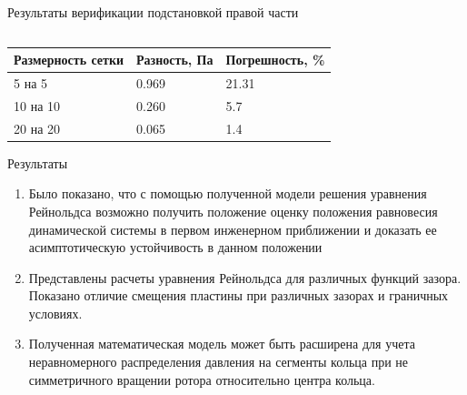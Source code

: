 \documentclass[ignoreonframetext,unicode]{beamer}
\begin{document}
\begin{frame}{Результаты верификации подстановкой правой части}
\begin{columns}
	\end{columns}

	\vspace*{-3mm}
\begin{table}[!htbp]
	\begin{tabular}{|l|l|l|}
		\hline
		\multicolumn{1}{|c|}{Размерность сетки} & \multicolumn{1}{c|}{Разность, Па} & Погрешность, \% \\ \hline
		5 на 5                                  & 0.969                              & 21.31            \\ \hline
		10 на 10                                & 0.260                              & 5.7            \\ \hline
		20 на 20                                & 0.065                              & 1.4            \\ \hline
	\end{tabular}
\end{table}
\end{frame}

\begin{frame}{Результаты}
	\begin{block}{}
	\begin{enumerate}	
		\item Было показано, что с помощью полученной модели решения уравнения Рейнольдса возможно получить положение оценку положения равновесия динамической системы в первом инженерном приближении и доказать ее асимптотическую устойчивость в данном положении
		\item Представлены расчеты уравнения Рейнольдса для различных функций зазора. Показано отличие смещения пластины при различных зазорах и граничных условиях.
		\item Полученная математическая модель может быть расширена для учета неравномерного распределения давления на сегменты кольца при не симметричного вращении ротора относительно центра кольца.
	\end{enumerate}
	\end{block}	

\end{frame}	
\end{document}
